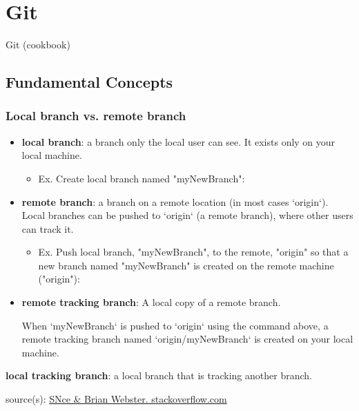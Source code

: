 \chapter{Git}

Git (cookbook)

\section{Fundamental Concepts}

\subsection{Local branch vs. remote branch}
\begin{itemize}
\item \textbf{local branch}:  a branch only the local user can see. It exists only on your local machine.

	\begin{itemize}
	\item  Ex. Create local branch named "myNewBranch":

	\end{itemize}

\item
\textbf{remote branch}: a branch on a remote location (in most cases `origin`). Local branches can be pushed to `origin` (a remote branch), where other users can track it.

	\begin{itemize}
	\item Ex. Push local branch, "myNewBranch", to the remote, "origin" so that a new branch named "myNewBranch" is created on the remote machine ("origin"):

	\end{itemize}


\item
\textbf{remote tracking branch}: A local copy of a remote branch.

When `myNewBranch` is pushed to `origin` using the command above, a remote tracking branch named `origin/myNewBranch` is created on your local machine.
\end{itemize}

\textbf{local tracking branch}: a local branch that is tracking another branch.

source(s): \href{https://stackoverflow.com/questions/16408300/what-are-the-differences-between-local-branch-local-tracking-branch-remote-bra}{SNce \& Brian Webster. stackoverflow.com}

